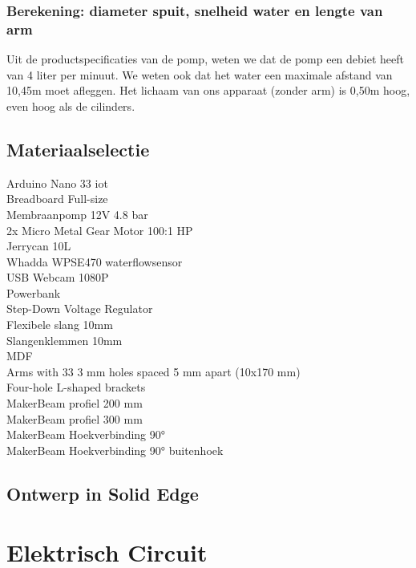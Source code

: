 \documentclass[kulak]{kulakarticle} %
\begin{document}
\subsubsection{Berekening: diameter spuit, snelheid water en lengte van arm}
Uit de productspecificaties van de pomp, weten we dat de pomp een debiet heeft van 4 liter per minuut. We weten ook dat het water een maximale afstand van 10,45m moet afleggen. Het lichaam van ons apparaat (zonder arm) is 0,50m hoog, even hoog als de cilinders. 

\subsection{Materiaalselectie}
Arduino Nano 33 iot \\
Breadboard Full-size \\
Membraanpomp 12V 4.8 bar \\
2x Micro Metal Gear Motor 100:1 HP \\
Jerrycan 10L\\
Whadda WPSE470 waterflowsensor \\
USB Webcam 1080P \\
Powerbank\\
Step-Down Voltage Regulator \\
Flexibele slang 10mm \\
Slangenklemmen 10mm \\
MDF \\
Arms with 33 3 mm holes spaced 5 mm apart (10x170 mm) \\
Four-hole L-shaped brackets \\
MakerBeam profiel 200 mm \\
MakerBeam profiel 300 mm \\
MakerBeam Hoekverbinding 90° \\
MakerBeam Hoekverbinding 90° buitenhoek \\


\subsection{Ontwerp in Solid Edge}


\section{Elektrisch Circuit}
\end{document}
